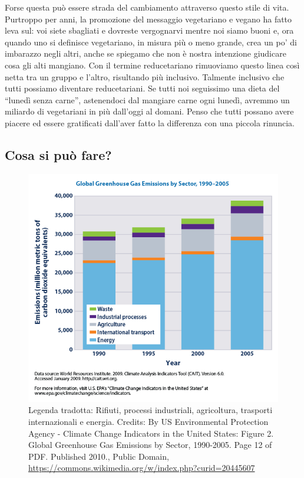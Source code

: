 \documentclass[12pt]{book} %
\newcounter{Figure}
\begin{document}
Forse questa può essere strada del cambiamento attraverso questo stile di vita. Purtroppo per anni, la promozione del
messaggio vegetariano e vegano ha fatto leva sul: voi siete sbagliati e dovreste vergognarvi mentre noi siamo buoni e,
ora quando uno si definisce vegetariano, in misura più o meno grande, crea un po' di imbarazzo negli altri, anche se
spiegamo che non è nostra intenzione giudicare cosa gli alti mangiano. Con il termine reducetariano rimuoviamo questo
linea così netta tra un gruppo e l'altro, risultando più inclusivo. Talmente inclusivo che tutti
possiamo diventare reducetariani. Se tutti noi seguissimo una dieta del “lunedì senza carne”, astenendoci dal mangiare
carne ogni lunedì, avremmo un miliardo di vegetariani in più dall'oggi al domani. Penso che tutti possano avere piacere
ed essere gratificati dall'aver fatto la differenza con una piccola rinuncia.

\clearpage\subsection{Cosa si può fare?}

\begin{figure}
  \centering
  \includegraphics[width=0.95\linewidth]{images/Libro-img024.png}
  \begin{minipage}{\linewidth}
    \caption{Legenda tradotta: Rifiuti, processi industriali,
agricoltura, trasporti internazionali e energia. 
Credits: By US Environmental Protection Agency - Climate Change Indicators in the United States: Figure 2. Global
Greenhouse Gas Emissions by Sector, 1990-2005. Page 12 of PDF. Published 2010., Public Domain,
\protect\url{https://commons.wikimedia.org/w/index.php?curid=20445607} }
  \end{minipage}
\end{figure}
\end{document}

